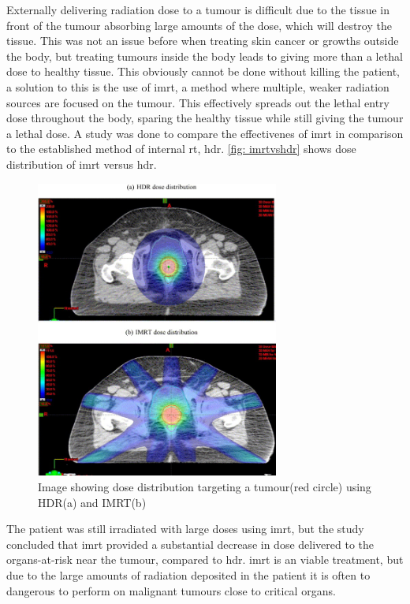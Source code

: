 \documentclass[main.tex]{subfiles}
\begin{document}
 Externally delivering radiation dose to a tumour is difficult due to the tissue in front of the tumour absorbing large amounts of the dose, which will destroy the tissue. This was not an issue before when treating skin cancer or growths outside the body, but treating tumours inside the body leads to giving more than a lethal dose to healthy tissue. This obviously cannot be done without killing the patient, a solution to this is the use of \gls{imrt}, a method where multiple, weaker radiation sources are focused on the tumour. This effectively spreads out the lethal entry dose throughout the body, sparing the healthy tissue while still giving the tumour a lethal dose. A study was done to compare the effectivenes of \gls{imrt} in comparison to the established method of internal \gls{rt}, \gls{hdr}\cite{imrtVShdr}. \autoref{fig: imrtvshdr} shows dose distribution of \gls{imrt} versus \gls{hdr}.

 \begin{figure}[!htpb]
    \centering
    \includegraphics[width=8cm, ]{images/imrt vs hdr.jpg}
    \caption{Image showing dose distribution targeting a tumour(red circle) using HDR(a) and IMRT(b)\cite{imrtVShdr}}
    \label{fig: imrtvshdr}
\end{figure}
\FloatBarrier 

The patient was still irradiated with large doses using \gls{imrt}, but the study concluded that \gls{imrt} provided a substantial decrease in dose delivered to the organs-at-risk near the tumour, compared to \gls{hdr}. \gls{imrt} is an viable treatment, but due to the large amounts of radiation deposited in the patient it is often to dangerous to perform on malignant tumours close to critical organs.
\end{document}
